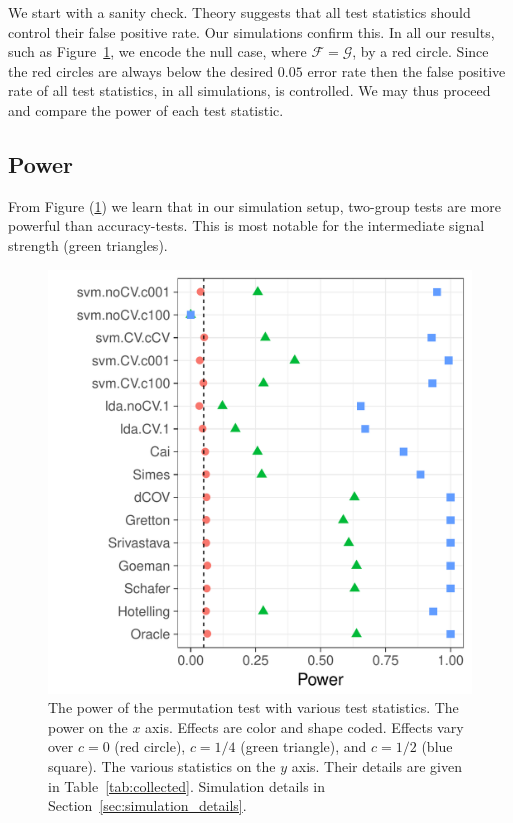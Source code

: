 \documentclass[]{bio}
\begin{document}
We start with a sanity check. 
Theory suggests that all test statistics should control their false positive rate. 
Our simulations confirm this.
In all our results, such as Figure~\ref{fig:simulation_1}, we encode the null case, where $\mathcal{F}=\mathcal{G}$, by a red circle. 
Since the red circles are always below the desired $0.05$ error rate then the false positive rate of all test statistics, in all simulations, is controlled. 
We may thus proceed and compare the power of each test statistic. 






\subsection{Power}
\label{sec:power}

From Figure (\ref{fig:simulation_1}) we learn that in our simulation setup, two-group tests are more powerful than accuracy-tests.
This is most notable for the intermediate signal strength (green triangles). 

\begin{figure}[h]
	\centering
	\includegraphics[width=0.7\columnwidth]{"art/file2"}
	\caption{
		The power of the permutation test with various test statistics. 
		The power on the $x$ axis. 
		Effects are color and shape coded. 
		Effects vary over $c=0$ (red circle), $c=1/4$ (green triangle), and $c=1/2$ (blue square). 
		The various statistics on the $y$ axis. 
		Their details are given in Table~\ref{tab:collected}. 
		Simulation details in Section~\ref{sec:simulation_details}.}	
	\label{fig:simulation_1}
\end{figure}
\end{document}
